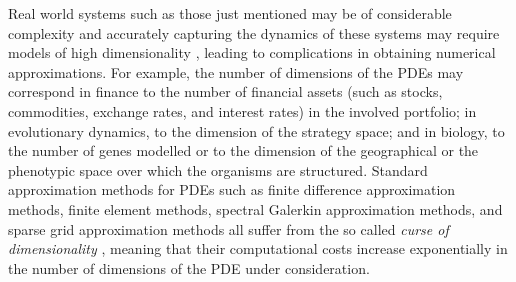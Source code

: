 Real world systems such as those just mentioned may be of considerable complexity and accurately capturing the dynamics of these systems may require models of high dimensionality \cite{Doebeli2010}, leading to complications in obtaining numerical approximations.
For example, the number of dimensions of the PDEs may correspond in finance to the number of financial assets (such as stocks, commodities, exchange rates, and interest rates) in the involved portfolio; in evolutionary dynamics, to the dimension of the strategy space; and in biology, to the number of genes modelled \cite{Pajaro2017} or to the dimension of the geographical or the phenotypic space over which the organisms are structured.
%
Standard approximation methods for PDEs such as finite difference approximation methods, finite element methods, spectral Galerkin approximation methods, and sparse grid approximation methods all suffer from the so called \emph{curse of dimensionality} \cite{Bellman1957}, meaning that their computational costs increase exponentially in the number of dimensions of the PDE under consideration. 

